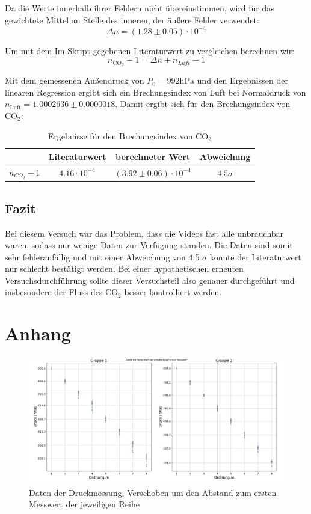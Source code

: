 \documentclass[a4paper, 11pt]{article}
\begin{document}
Da die Werte innerhalb ihrer Fehlern nicht übereinstimmen, wird für das gewichtete Mittel an Stelle des inneren, der äußere Fehler verwendet:
\begin{equation*}
\Delta n=(1.28 \pm 0.05)\cdot10^{-4}
\end{equation*}

Um mit dem Im Skript gegebenen Literaturwert zu vergleichen berechnen wir:
\begin{equation}
n_{\mathrm{CO_2}}-1=\Delta n + n_{Luft}-1
\end{equation}

Mit dem gemessenen Außendruck von $P_0=992\mathrm{hPa}$ und den Ergebnissen der linearen Regression ergibt sich ein Brechungsindex von Luft bei Normaldruck von $n_{\mathrm{Luft}}=1.0002636 \pm 0.0000018$.
Damit ergibt sich für den Brechungsindex von $\mathrm{CO_2}$:

\begin{table}[H]
\centering
	\begin{tabular}{|c|c|c|c|}
	\hline 
	& Literaturwert & berechneter Wert & Abweichung \\
	\hline 
	$n_{CO_2}-1$ & $4.16\cdot 10^{-4}$ & $(3.92\pm0.06)\cdot 10^{-4}$ & $4.5 \sigma$ \\
	\hline
	\end{tabular}
\caption{Ergebnisse für den Brechungsindex von $\mathrm{CO_2}$ }
\label{table:nCO2Ergebnis}
\end{table}

\subsection{Fazit}
Bei diesem Versuch war das Problem, dass die Videos fast alle unbrauchbar waren, sodass nur wenige Daten zur Verfügung standen. Die Daten sind somit sehr fehleranfällig und mit einer Abweichung von 4.5 $\sigma$ konnte der Literaturwert nur schlecht bestätigt werden. Bei einer hypothetischen erneuten Versuchsdurchführung sollte dieser Versuchsteil also genauer durchgeführt und insbesondere der Fluss des $\mathrm{CO_2}$ besser kontrolliert werden.


\clearpage
\section{Anhang}
\begin{figure}[H]
	\centering
	\includegraphics[scale=0.35]{./Bilder/DatenShifted.png}
	\caption{Daten der Druckmessung, Verschoben um den Abstand zum ersten Messwert der jeweiligen Reihe}
	\label{pic:RohdatenShifted}	
\end{figure}

\clearpage
\listoffigures
\listoftables
\end{document}
